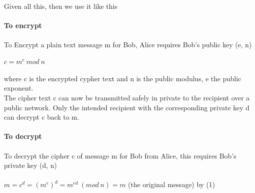 \documentclass[11pt]{article}   	%
\begin{document}
\\
Given all this, then we use it like this \\
\\
\textbf{To encrypt} \\
\\
To Encrypt a plain text message m for Bob, Alice requires Bob's public key (e, n) \\
\\
$ c = m^e \ mod \ n $ \\
\\
where c is the encrypted cypher text and n is the public modulus, e the public exponent.
\\
The cipher text c can now be transmitted safely in private to the recipient over a public network. Only the intended recipient with the corresponding private key d can decrypt c back to m. \\
\\
\textbf{To decrypt} \\
\\
To decrypt the cipher c of message m for Bob from Alice, this requires Bob's private key (d, n) \\
\\
$ m = c^d = (m^e)^d = m^{ed} \ (mod \ n) = m$ (the original message) by (1) \\


\break 
\end{document}
